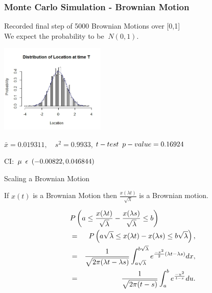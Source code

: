 \begin{frame}
   \frametitle{Monte Carlo Simulation - Brownian Motion}
	Recorded final step of 5000 Brownian Motions over [0,1]\\
	We expect the probability to be $~N(0,1)$. \\
	\begin{center}
		\includegraphics[width=5cm]{img/bpath1montecarlohist}\\
	\end{center}
	\begin{center}
	$\bar{x}=0.019311,\hspace{1em} s^{2}=0.9933$,\hspace{1em} $t-test \hspace{.5em} p-value=0.16924$ 
	\end{center} 
	\centerline{CI:\hspace{1em}  $\mu\hspace{.5em}\epsilon \hspace{.5em}(-0.00822 , 0.046844)$}
\end{frame}


\begin{frame}{Scaling a Brownian Motion}
\vfill

If $x(t)$ is a Brownian Motion then 
$\displaystyle \frac{x(\lambda t)}{\sqrt{\lambda}}$ 
is a Brownian motion.
	
\vfill
\begin{eqnarray*}
  \lefteqn{
	P \left(a \leq \frac{x(\lambda t)}{\sqrt{\lambda}}-\frac{x(\lambda s)}{\sqrt{\lambda}} \leq b \right)
	} & & \\
    & = & P \left(a \sqrt{\lambda} \leq x(\lambda t) - x (\lambda s) \leq b \sqrt{\lambda} \right), \\
	& = & \displaystyle \frac{1}{\sqrt{2 \pi (\lambda t -\lambda s)}} 
                    \int_{a \sqrt{\lambda}}^{b \sqrt{\lambda}} e^{\frac{-x^2}{2}(\lambda t- \lambda s)} dx, \\
    & = & \frac{1}{\sqrt{2 \pi (t-s)}} \int_{a}^{b} e^{\frac{-u^2}{t-s}}du.
 \end{eqnarray*}
\end{frame}

